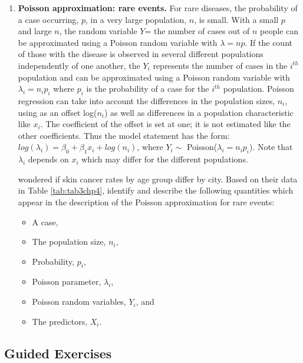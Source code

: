 \documentclass[
]{krantz}
\providecommand{\tightlist}{%
  \setlength{\itemsep}{0pt}\setlength{\parskip}{0pt}}
\begin{document}
\begin{enumerate}
\def\labelenumi{\arabic{enumi}.}
\setcounter{enumi}{15}
\item
  \textbf{Poisson approximation: rare events.} For rare diseases, the probability of a case occurring, \(p\), in a very large population, \(n\), is small. With a small \(p\) and large \(n\), the random variable \(Y\)= the number of cases out of \(n\) people can be approximated using a Poisson random variable with \(\lambda = np\). If the count of those with the disease is observed in several different populations independently of one another, the \(Y_i\) represents the number of cases in the \(i^{th}\) population and can be approximated using a Poisson random variable with \(\lambda_i=n_ip_i\) where \(p_i\) is the probability of a case for the \(i^{th}\) population. Poisson regression can take into account the differences in the population sizes, \(n_i\), using as an offset log(\(n_i\)) as well as differences in a population characteristic like \(x_i\). The coefficient of the offset is set at one; it is not estimated like the other coefficients. Thus the model statement has the form: \(log(\lambda_i) = \beta_0+\beta_1x_i + log(n_i)\), where \(Y_i  \sim\) Poisson(\(\lambda_i = n_i p_i\)). Note that \(\lambda_i\) depends on \(x_i\) which may differ for the different populations.

  \citet{Scotto1974} wondered if skin cancer rates by age group differ by city. Based on their data in Table \ref{tab:tab3chp4}, identify and describe the following quantities which appear in the description of the Poisson approximation for rare events:

  \begin{itemize}
  \tightlist
  \item
    A case,
  \item
    The population size, \(n_i\),
  \item
    Probability, \(p_i\),
  \item
    Poisson parameter, \(\lambda_i\),
  \item
    Poisson random variables, \(Y_i\), and
  \item
    The predictors, \(X_i\).
  \end{itemize}
\end{enumerate}

\subsection{Guided Exercises}\label{guided-exercises-3}
\end{document}
